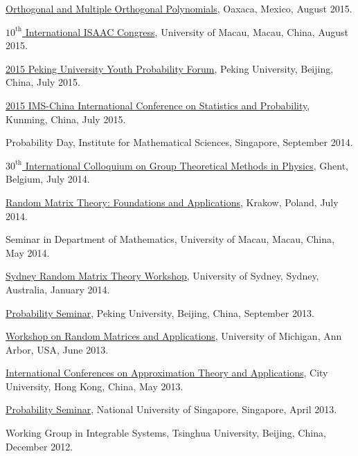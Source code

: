 \documentclass[12pt,a4paper]{article}
\newenvironment{item_list}{
 \begin{list}{}{
   \setlength{\leftmargin}{1.5em}
   \setlength{\itemsep}{0.25em}
   \setlength{\parskip}{0pt}
   \setlength{\parsep}{0.25em}
 }
}{
 \end{list}
}
\begin{document}
\begin{item_list}
\item
  \href{http://www.birs.ca/events/2015/5-day-workshops/15w5022}{Orthogonal and Multiple Orthogonal Polynomials}, Oaxaca, Mexico, August 2015.
\item
  \href{http://www.fst.umac.mo/conference/isaac2015/}{$10^{\text{th}}$ International ISAAC Congress}, University of Macau, Macau, China, August 2015.
\item
  \href{http://www.math.pku.edu.cn/teachers/liuyong/2015forum/admin/html/default.php}{2015 Peking University Youth Probability Forum}, Peking University, Beijing, China, July 2015.
\item
  \href{http://www.2015imschina.com/}{2015 IMS-China International Conference on Statistics and Probability}, Kunming, China, July 2015.
\item
  Probability Day, Institute for Mathematical Sciences, Singapore, September 2014.
\item \href{http://th-www.if.uj.edu.pl/~matrix2014/index.html}{$30^{\text{th}}$ International Colloquium on Group Theoretical Methods in Physics}, Ghent, Belgium, July 2014.
\item
  \href{http://th-www.if.uj.edu.pl/~matrix2014/index.html}{Random Matrix Theory: Foundations and Applications}, Krakow, Poland, July 2014.
\item
  Seminar in Department of Mathematics, University of Macau, Macau, China, May 2014.
\item
  \href{http://www.maths.usyd.edu.au/u/olver/conferences/RMT.html}{Sydney Random Matrix Theory Workshop}, University of Sydney, Sydney, Australia, January 2014. 
\item
  \href{http://www.math.pku.edu.cn/teachers/liuyong/seminarC.htm}{Probability Seminar}, Peking University, Beijing, China, September 2013.
\item
  \href{http://web.eecs.umich.edu/~rajnrao/rmt2013/}{Workshop on Random Matrices and Applications}, University of Michigan, Ann Arbor, USA, June 2013.
\item
  \href{http://www6.cityu.edu.hk/ma/maicata/}{International Conferences on Approximation Theory and Applications}, City University, Hong Kong, China, May 2013.
\item
  \href{http://ww1.math.nus.edu.sg/seminars.aspx?CatID=9}{Probability Seminar}, National University of Singapore, Singapore, April 2013.
\item
  Working Group in Integrable Systems, Tsinghua University, Beijing, China, December 2012.
\item

\end{item_list}
\end{document}
